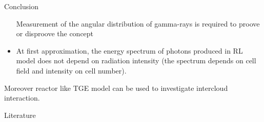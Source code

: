 \documentclass[final,hyperref={pdfpagelabels=false}]{beamer}
\begin{document}
\begin{frame}{}
\begin{columns}[t]
\begin{column}{0.32\linewidth}
\begin{block}{Conclusion}
\begin{itemize}
                    Measurement of the angular distribution of gamma-rays is required to proove or disproove the concept
                    
                    \item At first approximation, the energy spectrum of photons produced in RL model does not depend on radiation intensity (the spectrum depends on cell field and intensity on cell number).
                \end{itemize}
                Moreover reactor like TGE model can be used to investigate intercloud interaction.
				                    
			\end{block}
			\begin{block}{{\large Literature}}
			{\small	
				{}}
			\end{block}
			                
		\end{column}%
		            
	\end{columns}
	        
	        
\end{frame}
\end{document}
